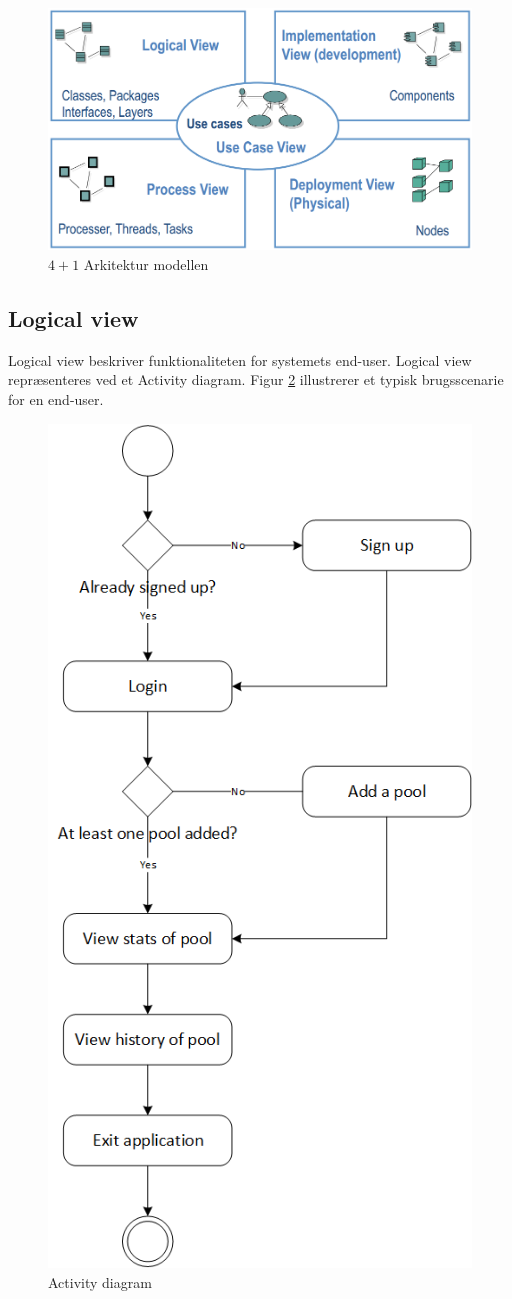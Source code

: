 \begin{figure}[h]
	\centering
	\includegraphics[width=0.9\linewidth]{figs/arkitektur/41model}
	\caption{$4+1$ Arkitektur modellen \cite{flylib}}
	\label{fig:41model}
\end{figure}

\subsection{Logical view}
Logical view beskriver funktionaliteten for systemets end-user. Logical view repræsenteres ved et Activity diagram. Figur \ref{fig:ActivityDiagram} illustrerer et typisk brugsscenarie for en end-user. 
\begin{figure}
\centering
\includegraphics[width=0.55\linewidth]{figs/arkitektur/ActivityDiagram.PNG}
\caption{Activity diagram}
\label{fig:ActivityDiagram}
\end{figure}

